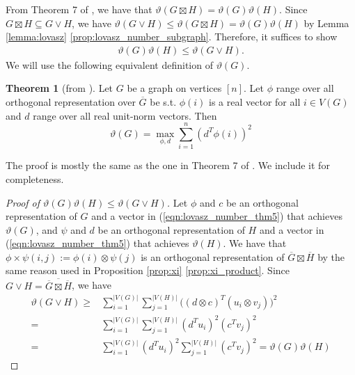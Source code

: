 \documentclass[journal, onecolumn, draftcls]{IEEEtran}
\theoremstyle{definition}
\newtheorem{theorem}{Theorem}
\begin{document}
From Theorem 7 of \cite{lovasz1979shannon}, we have that $\vartheta(G\boxtimes H) = \vartheta(G)\vartheta(H)$. Since $G\boxtimes H\subseteq G\lor H$, we have $\vartheta(G\lor H)\le \vartheta(G\boxtimes H) =\vartheta(G)\vartheta(H)$ by Lemma \ref{lemma:lovasz} \ref{prop:lovasz_number_subgraph}. Therefore, it suffices to show
\begin{align*}
    \vartheta(G)\vartheta(H)\le \vartheta(G\lor H).
\end{align*} 
We will use the following equivalent definition of $\vartheta(G)$.
\begin{theorem}[from \cite{lovasz1979shannon}]
    Let $G$ be a graph on vertices $[n]$. Let $\phi$ range over all orthogonal representation over $\overline{G}$ be s.t. $\phi(i)$ is a real vector for all $i\in V(G)$ and $d$ range over all real unit-norm vectors. Then 
    \begin{equation}\label{eqn:lovasz_number_thm5}
        \vartheta(G) = \max_{\phi,d}\sum_{i=1}^n(d^T\phi(i))^2
    \end{equation}
\end{theorem}
The proof  is mostly the same as the one in Theorem 7 of \cite{lovasz1979shannon}. We include it for completeness.
\begin{proof}[Proof of $ \vartheta(G)\vartheta(H)\le \vartheta(G\lor H)$]
Let $\phi$ and $c$ be an orthogonal representation of $G$ and a vector in  (\ref{eqn:lovasz_number_thm5}) that achieves $\vartheta(G)$, and $\psi$ and $d$ be an orthogonal representation of $H$ and a vector in   (\ref{eqn:lovasz_number_thm5})   that achieves $\vartheta(H)$. We have that $\phi \times\psi(i,j):= \phi(i) \otimes \psi(j)$
is an orthogonal representation of $\overline{G}\boxtimes \overline{H}$ by the same reason used in Proposition \ref{prop:xi} \ref{prop:xi_product}. Since $G\lor H =\overline{\overline{G}\boxtimes\overline{H}}$, we have
\begin{align*}
    \vartheta(G\lor H)  \ge &\sum_{i=1}^{|V(G)|}\sum_{j=1}^{|V(H)|} \Big ( (d\otimes c)^T (u_i \otimes v_j) \Big )^2\\
        = &\sum_{i=1}^{|V(G)|} \sum_{j=1}^{|V(H)|}(d^Tu_i)^2(c^Tv_j)^2\\
        =&\sum_{i=1}^{|V(G)|}  (d^Tu_i)^2\sum_{j=1}^{|V(H)|}(c^Tv_j)^2 = \vartheta(G)\vartheta(H)
\end{align*}
\end{proof}

 
\end{document}
